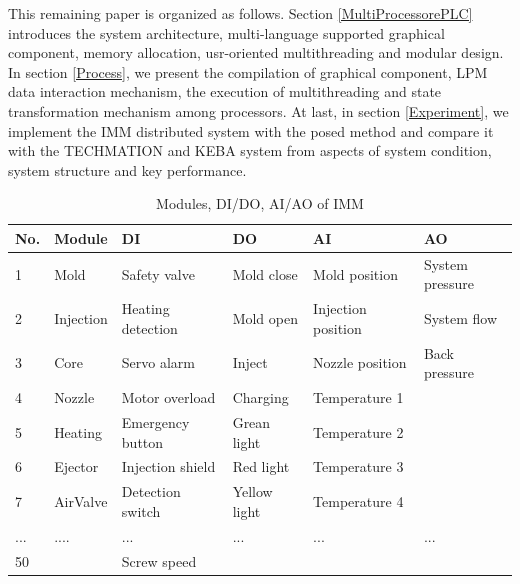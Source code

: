 \documentclass[journal,UTF8]{IEEEtran}
\begin{document}
This remaining paper is organized as follows. Section \ref{MultiProcessorePLC} introduces the system architecture, multi-language supported graphical component, memory allocation, usr-oriented multithreading and modular design. In section \ref{Process}, we present the compilation of graphical component, LPM data interaction mechanism, the execution of multithreading and state transformation mechanism among processors. At last, in section \ref{Experiment}, we implement the IMM distributed system with the posed method and compare it with the TECHMATION and KEBA system from aspects of system condition, system structure and key performance.
\begin{table}
	\scriptsize \caption{Modules, DI/DO, AI/AO of IMM}
	\label{table:IMMSystem}
	\begin{center}
		\renewcommand{\arraystretch}{1.4}
		\setlength\tabcolsep{3pt}
		\begin{tabular}{|p{0.3cm}|p{0.8cm}|p{1.7cm}|p{1.2cm}|p{1.7cm}|p{1.5cm}|}
			\hline
			No. & Module      & DI                       & DO           & AI                     & AO\\
			\hline
			1  & Mold       & Safety valve & Mold close     & Mold position        &System pressure \\
			\hline
			2  & Injection  & Heating detection & Mold open      & Injection position    &System flow\\
			\hline
			3  & Core      & Servo alarm         & Inject          & Nozzle position      &Back pressure\\
			\hline
			4  & Nozzle    & Motor overload            & Charging         & Temperature 1        &  \\
			\hline
			5  & Heating   & Emergency button           & Grean light       & Temperature 2        &\\
			\hline
			6  & Ejector   & Injection shield          & Red light         & Temperature 3       &\\
			\hline
			7  & AirValve & Detection switch          & Yellow light       & Temperature 4      &\\
            \hline
			...  & ....        & ...                       & ...                & ...                &...\\
            \hline
			50  &             & Screw speed                &                    &                     & \\
\hline
		\end{tabular}
	\end{center}
\end{table}
\end{document}
